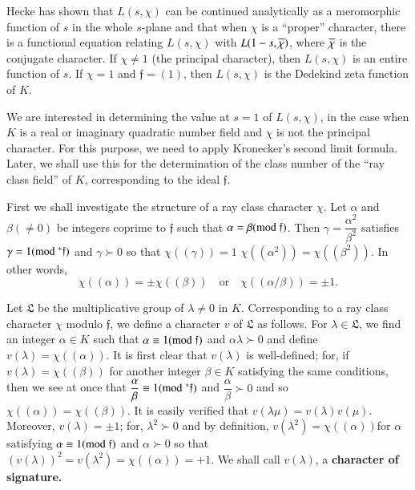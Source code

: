 Hecke has shown that $L(s,\chi)$ can be continued analytically as a
meromorphic function of $s$ in the whole $s$-plane and that when
$\chi$ is a ``proper'' character, there is a functional equation
relating $L(s,\chi)$ with $L(1-s,\overline{\chi})$, where $\overline{\chi}$ is the
conjugate character. If $\chi\neq 1$ (the principal character), then
$L(s,\chi)$ is an entire function of $s$. If $\chi=1$ and
$\mathfrak{f}=(1)$, then $L(s,\chi)$ is the Dedekind zeta function of
$K$.

We are interested in determining the value at $s=1$ of $L(s,\chi)$, in
the case when $K$ is a real or imaginary quadratic number field and
$\chi$ is not the principal character. For this purpose, we need to
apply Kronecker's second limit formula. Later, we shall use this for
the determination of the class number of the ``ray class field'' of
$K$, corresponding to the ideal $\mathfrak{f}$.

First we shall investigate the structure of a ray class character
$\chi$. Let $\alpha$ and $\beta(\neq 0)$ be integers coprime to
$\mathfrak{f}$ such that $\alpha=\beta(\rm{mod} \;\mathfrak{f})$. Then
$\gamma=\dfrac{\alpha^{2}}{\beta^{2}}$ satisfies
$\gamma=1(\rm{mod} \;^{\ast}\mathfrak{f})$ and $\gamma \succ 0$ so that
$\chi((\gamma))=1$ \ie $\chi((\alpha^{2}))=\chi((\beta^{2}))$. In
other words,
$$
\chi((\alpha))=\pm \chi((\beta))\quad\text{or}\quad
\chi((\alpha/\beta))=\pm 1.
$$

Let $\mathfrak{L}$ be the multiplicative group of $\lambda\neq 0$ in
$K$. Corresponding to a ray class character $\chi$ modulo
$\mathfrak{f}$, we define a character $v$ of $\mathfrak{L}$ as
follows. For $\lambda\in\mathfrak{L}$, we find an integer $\alpha\in
K$ such that $\alpha\equiv 1(\rm{mod} \; \mathfrak{f})$ and $\alpha\lambda \succ 0$
and define $v(\lambda)=\chi((\alpha))$. It is first clear that
$v(\lambda)$ is well-defined; for, if $v(\lambda)=\chi((\beta))$ for
another integer $\beta\in K$ satisfying the same conditions, then we
see at once that $\dfrac{\alpha}{\beta}\equiv
1(\rm{mod} \;^{\ast}\mathfrak{f})$ and $\dfrac{\alpha}{\beta} \succ 0$ and so
$\chi((\alpha))=\chi((\beta))$. It is easily verified that
$v(\lambda\mu)=v(\lambda)v(\mu)$. Moreover, $v(\lambda)=\pm 1$; for,
$\lambda^{2} \succ 0$ and by definition,
$v(\lambda^{2})=\chi((\alpha))$\pageoriginale for $\alpha$ satisfying
$\alpha\equiv 1(\rm{mod} \;\mathfrak{f})$ and $\alpha \succ 0$ so that
$(v(\lambda))^{2}=v(\lambda^{2})=\chi((\alpha))=+1$. We shall call
$v(\lambda)$, a {\bf character of signature.}


